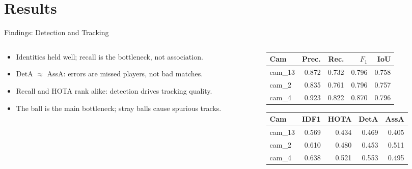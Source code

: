 \section{Results}
\label{sec:results}
\begin{frame}{Findings: Detection and Tracking}
\begin{columns}[T]
  \begin{column}{0.52\textwidth}
    \begin{itemize}
      \item Identities held well; recall is the bottleneck, not association.
      \item DetA $\approx$ AssA: errors are missed players, not bad matches.
      \item Recall and HOTA rank alike: detection drives tracking quality.
      \item The ball is the main bottleneck; stray balls cause spurious tracks.
    \end{itemize}
  \end{column}
  \begin{column}{0.46\textwidth}
    \centering
    \scriptsize
    \begin{tabular}{lrrrr}
      \toprule
      Cam & Prec. & Rec. & $F_1$ & IoU \\
      \midrule
      cam\_13 & 0.872 & 0.732 & 0.796 & 0.758 \\
      cam\_2  & 0.835 & 0.761 & 0.796 & 0.757 \\
      cam\_4  & 0.923 & 0.822 & 0.870 & 0.796 \\
      \bottomrule
    \end{tabular}

    \vspace{2em}

    \begin{tabular}{lrrrr}
      \toprule
      Cam & IDF1 & HOTA & DetA & AssA \\
      \midrule
      cam\_13 & 0.569 & 0.434 & 0.469 & 0.405 \\
      cam\_2  & 0.610 & 0.480 & 0.453 & 0.511 \\
      cam\_4  & 0.638 & 0.521 & 0.553 & 0.495 \\
      \bottomrule
    \end{tabular}
  \end{column}
\end{columns}
\end{frame}

